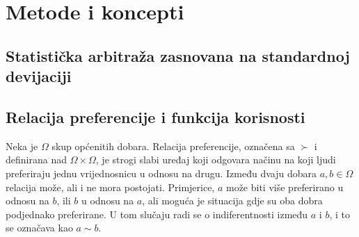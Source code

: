 \documentclass[lmodern, utf8, diplomski, numeric]{fer}
\begin{document}
\chapter{Metode i koncepti}

  \section{Statistička arbitraža zasnovana na standardnoj devijaciji}

  \section{Relacija preferencije i funkcija korisnosti}

  Neka je $\Omega$ skup općenitih dobara.
  Relacija preferencije, označena sa $\succ$ i definirana nad $\Omega \times \Omega$, je strogi slabi uređaj koji odgovara načinu na koji ljudi preferiraju jednu vrijednosnicu u odnosu na drugu.
  Između dvaju dobara $a, b \in \Omega$ relacija može, ali i ne mora postojati.
  Primjerice, $a$ može biti više preferirano u odnosu na $b$, ili $b$ u odnosu na $a$, ali moguća je situacija gdje su oba dobra podjednako preferirane.
  U tom slučaju radi se o indiferentnosti između $a$ i $b$, i to se označava kao $a \sim b$.
\end{document}
